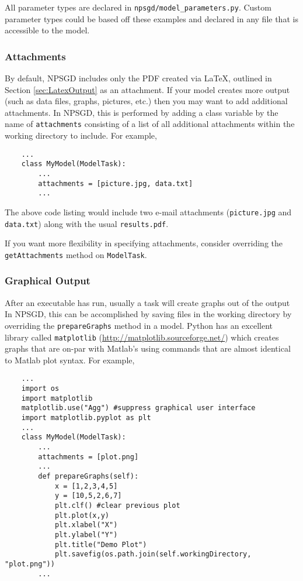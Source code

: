 \documentclass{article}
\newcommand{\mpath}[1]{\texttt{#1}}
\begin{document}
All parameter types are declared in \mpath{npsgd/model\_parameters.py}. Custom
parameter types could be based off these examples and declared in any file that
is accessible to the model.

\subsubsection{Attachments}
\label{sec:attachments}
By default, NPSGD includes only the PDF created via \LaTeX, outlined in Section
\ref{sec:LatexOutput} as an attachment. If your model creates more output (such
as data files, graphs, pictures, etc.) then you may want to add additional
attachments. In NPSGD, this is performed by adding a class variable by the name
of \texttt{attachments} consisting of a list of all additional attachments
within the working directory to include. For example,
\begin{lstlisting}
    ...
    class MyModel(ModelTask):
        ...
        attachments = [picture.jpg, data.txt]
        ...
\end{lstlisting}
The above code listing would include two e-mail attachments (\mpath{picture.jpg}
and \mpath{data.txt}) along with the usual \mpath{results.pdf}.

If you want more flexibility in specifying attachments, consider overriding the
\texttt{getAttachments} method on \texttt{ModelTask}.

\subsubsection{Graphical Output}
After an executable has run, usually a task will create graphs out of the output
In NPSGD, this can be accomplished by saving files in the working
directory by overriding the \texttt{prepareGraphs} method in a model. Python has
an excellent library called \texttt{matplotlib}
(\url{http://matplotlib.sourceforge.net/}) which creates graphs that are on-par
with Matlab's using commands that are almost identical to Matlab plot syntax.
For example,
\begin{lstlisting}
    ...
    import os
    import matplotlib
    matplotlib.use("Agg") #suppress graphical user interface
    import matplotlib.pyplot as plt
    ...
    class MyModel(ModelTask):
        ...
        attachments = [plot.png]
        ...
        def prepareGraphs(self):
            x = [1,2,3,4,5]
            y = [10,5,2,6,7]
            plt.clf() #clear previous plot
            plt.plot(x,y)
            plt.xlabel("X")
            plt.ylabel("Y")
            plt.title("Demo Plot")
            plt.savefig(os.path.join(self.workingDirectory, "plot.png"))
        ...
\end{lstlisting}
\end{document}
